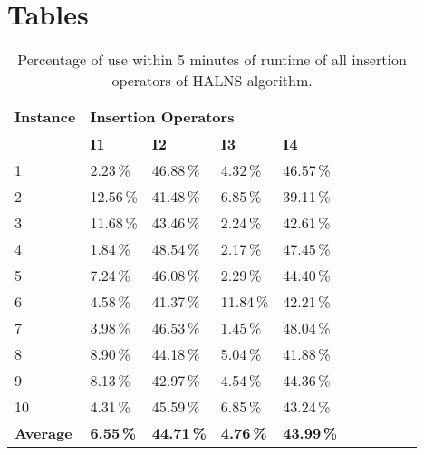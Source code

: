 \documentclass[thesis=M,english]{FITthesis}[2012/10/20]
\begin{document}
\chapter{Tables} \label{app:tables}
\begin{table}[!ht]
    \centering
    {\renewcommand{\arraystretch}{1.5}
    \begin{tabular}{llllllllll}
    \hline
    \textbf{Instance} & \multicolumn{4}{l}{\textbf{Insertion Operators}}                        \\ \hline
    \textbf{}         & \textbf{I1}       & \textbf{I2}        & \textbf{I3}       & \textbf{I4}\\ \hline
    1                 & 2.23\,\%          & 46.88\,\%          & 4.32\,\%          & 46.57\,\%  \\
    2                 & 12.56\,\%         & 41.48\,\%          & 6.85\,\%          & 39.11\,\%  \\
    3                 & 11.68\,\%         & 43.46\,\%          & 2.24\,\%          & 42.61\,\%  \\
    4                 & 1.84\,\%          & 48.54\,\%          & 2.17\,\%          & 47.45\,\%  \\
    5                 & 7.24\,\%          & 46.08\,\%          & 2.29\,\%          & 44.40\,\%  \\
    6                 & 4.58\,\%          & 41.37\,\%          & 11.84\,\%         & 42.21\,\%  \\
    7                 & 3.98\,\%          & 46.53\,\%          & 1.45\,\%          & 48.04\,\%  \\
    8                 & 8.90\,\%          & 44.18\,\%          & 5.04\,\%          & 41.88\,\%  \\
    9                 & 8.13\,\%          & 42.97\,\%          & 4.54\,\%          & 44.36\,\%  \\
    10                & 4.31\,\%          & 45.59\,\%          & 6.85\,\%          & 43.24\,\%  \\ \hline
    \textbf{Average}  & \textbf{6.55\,\%} & \textbf{44.71\,\%} & \textbf{4.76\,\%} & \textbf{43.99\,\%}
    \end{tabular}}
    \caption{Percentage of use within 5 minutes of runtime of all insertion operators of HALNS algorithm.}
    \label{tab:res-operator-percentage-insertion}
    \end{table}
\end{document}

